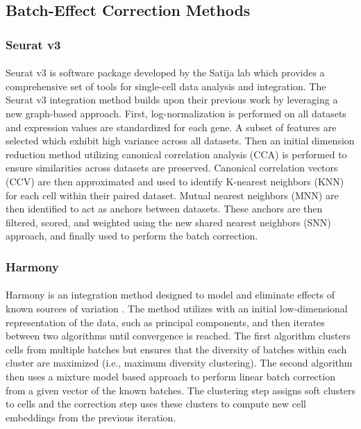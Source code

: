 \documentclass[
12pt, %
letterpaper, %
oneside, %
headinclude,footinclude, %
BCOR5mm, %
]{scrartcl}
\begin{document}
\subsection{Batch-Effect Correction Methods}

\subsubsection*{Seurat v3}

\paragraph*{}
Seurat v3 \citep{stuart2019comprehensive} is software package developed by the Satija lab which provides a comprehensive set of tools for single-cell data analysis and integration. The Seurat v3 integration method builds upon their previous work by leveraging a new graph-based approach. First, log-normalization is performed on all datasets and expression values are standardized for each gene. A subset of features are selected which exhibit high variance across all datasets. Then an initial dimension reduction method utilizing canonical correlation analysis (CCA) is performed to ensure similarities across datasets are preserved. Canonical correlation vectors (CCV) are then approximated and used to identify K-nearest neighbors (KNN) for each cell within their paired dataset. Mutual nearest neighbors (MNN) are then identified to act as anchors between datasets. These anchors are then filtered, scored, and weighted using the new shared nearest neighbors (SNN) approach, and finally used to perform the batch correction.

\subsubsection*{Harmony}

\paragraph*{}
Harmony is an integration method designed to model and eliminate effects of known sources of variation \citep{korsunsky2019fast}. The method utilizes with an initial low-dimensional representation of the data, such as principal components, and then iterates between two algorithms until convergence is reached. The first algorithm clusters cells from multiple batches but ensures that the diversity of batches within each cluster are maximized (i.e., maximum diversity clustering). The second algorithm then uses a mixture model based approach to perform linear batch correction from a given vector of the known batches. The clustering step assigns soft clusters to cells and the correction step uses these clusters to compute new cell embeddings from the previous iteration.
\end{document}
